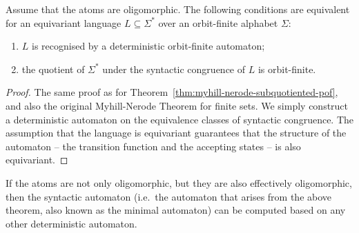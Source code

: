 \begin{theorem}\label{thm:myhill-nerode-oligo}
	Assume that the atoms are oligomorphic. 
    The following conditions are equivalent for an equivariant language $L \subseteq \Sigma^*$ over an orbit-finite alphabet $\Sigma$:
    \begin{enumerate}
        \item\label{item:myhill-nerode-recognised-oligo} $L$ is recognised by a deterministic orbit-finite automaton;
        \item\label{item:myhill-nerode-orbit-finite-oligo} the quotient of $\Sigma^*$ under the syntactic congruence of $L$ is orbit-finite.
    \end{enumerate}
\end{theorem}
\begin{proof}
	The same proof as for Theorem~\ref{thm:myhill-nerode-subquotiented-pof}, and also the original Myhill-Nerode Theorem for finite sets. We simply construct a deterministic automaton on the equivalence classes of syntactic congruence. The assumption that the language is equivariant guarantees that the structure of the automaton -- the transition function and the accepting states -- is also equivariant. 
\end{proof}

If the atoms are not only oligomorphic, but they are also effectively oligomorphic, then the syntactic automaton (i.e.~the automaton that arises from the above theorem, also known as the minimal automaton) can be computed based on any other deterministic automaton.


